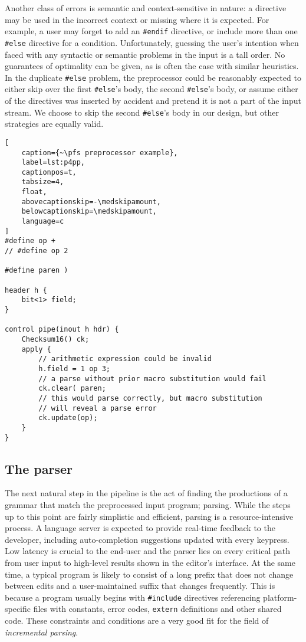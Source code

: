 Another class of errors is semantic and context-sensitive in nature: a directive
may be used in the incorrect context or missing where it is expected. For
example, a user may forget to add an \texttt{\#endif} directive, or include more
than one \texttt{\#else} directive for a condition. Unfortunately, guessing the
user's intention when faced with any syntactic or semantic problems in the input
is a tall order. No guarantees of optimality can be given, as is often the case
with similar heuristics. In the duplicate \texttt{\#else} problem, the
preprocessor could be reasonably expected to either skip over the first
\texttt{\#else}'s body, the second \texttt{\#else}'s body, or assume either of
the directives was inserted by accident and pretend it is not a part of the
input stream. We choose to skip the second \texttt{\#else}'s body in our design,
but other strategies are equally valid.

\begin{lstlisting}[
	caption={~\pfs preprocessor example},
	label=lst:p4pp,
	captionpos=t,
	tabsize=4,
	float,
	abovecaptionskip=-\medskipamount,
	belowcaptionskip=\medskipamount,
	language=c
]
#define op +
// #define op 2

#define paren )

header h {
	bit<1> field;
}

control pipe(inout h hdr) {
	Checksum16() ck;
	apply {
		// arithmetic expression could be invalid
		h.field = 1 op 3;
		// a parse without prior macro substitution would fail
		ck.clear( paren;
		// this would parse correctly, but macro substitution
		// will reveal a parse error
		ck.update(op);
	}
}
\end{lstlisting}


\subsection{The parser}

The next natural step in the pipeline is the act of finding the productions of a
\pfs grammar that match the preprocessed input program; parsing. While the steps
up to this point are fairly simplistic and efficient, parsing is a
resource-intensive process. A language server is expected to provide real-time
feedback to the developer, including auto-completion suggestions updated with
every keypress. Low latency is crucial to the end-user and the
parser lies on every critical path from user input to high-level results shown
in the editor's interface. At the same time, a typical \pfs program is likely to
consist of a long prefix that does not change between edits and a
user-maintained suffix that changes frequently. This is because a \pfs program
usually begins with \texttt{\#include} directives referencing platform-specific
files with constants, error codes, \texttt{extern} definitions and other shared
code. These constraints and conditions are a very good fit for the field of
\emph{incremental parsing}.

